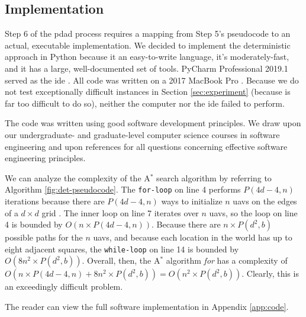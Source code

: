 \documentclass[../main.tex]{subfiles}
\begin{document}
\subsection{Implementation}\label{det:implementation}

Step 6 of the \ac{pdad} process requires a mapping from Step 5's pseudocode to an actual, executable implementation. We decided to implement the deterministic approach in Python because it an easy-to-write language, it's moderately-fast, and it has a large, well-documented set of tools. PyCharm Professional 2019.1 served as the \ac{ide} \cite{python:pycharm}. All code was written on a 2017 MacBook Pro \cite{apple:macbook}. Because we do not test exceptionally difficult \probs instances in Section \ref{sec:experiment} (because \probs is far too difficult to do so), neither the computer nor the \ac{ide} failed to perform.

The code was written using good software development principles. We draw upon our undergraduate- and graduate-level computer science courses in software engineering and upon references \cite{Sommerville2010, Gamma1994, Gomaa2011} for all questions concerning effective software engineering principles.

We can analyze the complexity of the A$^*$ search algorithm by referring to Algorithm \ref{fig:det-pseudocode}. The \texttt{for-loop} on line 4 performs $P(4d-4, n)$ iterations because there are $P(4d-4,n)$ ways to initialize $n$ \acp{uav} on the edges of a $d\times d$ grid \cite{wikipedia:permutation}. The inner loop on line 7 iterates over $n$ \acp{uav}, so the loop on line 4 is bounded by $O(n\times P(4d-4,n))$. Because there are $n\times P(d^2,b)$ possible paths for the $n$ \acp{uav}, and because each location in the world has up to eight adjacent squares, the \texttt{while-loop} on line 14 is bounded by $O(8n^2\times P(d^2,b))$. Overall, then, the A$^*$ algorithm \textit{for \prob} has a complexity of $O(n\times P(4d-4,n)+8n^2\times P(d^2,b))=O(n^2\times P(d^2,b))$. Clearly, this is an exceedingly difficult problem.

The reader can view the full software implementation in Appendix \ref{app:code}.
\end{document}
